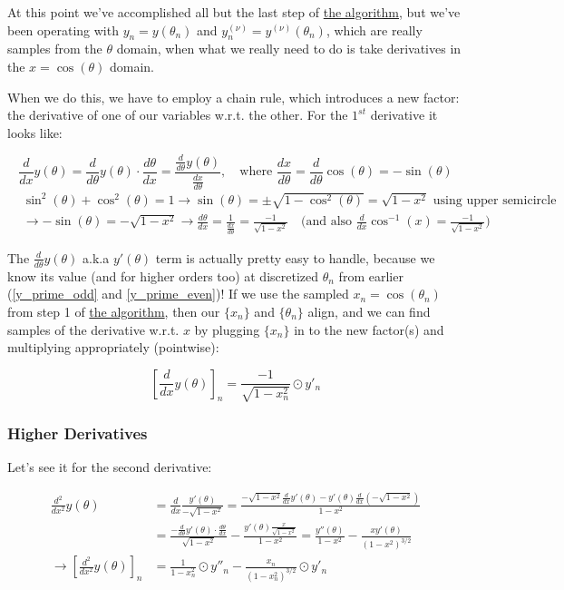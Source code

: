 \documentclass[10pt]{article}
\begin{document}
At this point we've accomplished all but the last step of \hyperref[algo]{the algorithm}, but we've been operating with $y_n = y(\theta_n)$ and $y_n^{(\nu)} = y^{(\nu)}(\theta_n)$, which are really samples from the $\theta$ domain, when what we really need to do is take derivatives in the $x = \cos(\theta)$ domain.

When we do this, we have to employ a chain rule, which introduces a new factor: the derivative of one of our variables w.r.t. the other. For the $1^{st}$ derivative it looks like:

$$\frac{d}{dx} y(\theta) = \frac{d}{d\theta} y(\theta) \cdot \frac{d\theta}{dx} = \frac{\frac{d}{d\theta} y(\theta)}{\frac{dx}{d\theta}}, \quad \text{where } \frac{dx}{d\theta} = \frac{d}{d\theta} \cos(\theta) = -\sin(\theta)$$
\begin{align*}
	& \sin^2(\theta) + \cos^2(\theta) = 1 \longrightarrow \sin(\theta) = \pm \sqrt{1-\cos^2(\theta)} = \sqrt{1 - x^2} \text{ using upper semicircle}\\
	& \longrightarrow -\sin(\theta) = -\sqrt{1 - x^2} \longrightarrow \frac{d\theta}{dx} = \frac{1}{\frac{dx}{d\theta}} = \frac{-1}{\sqrt{1 - x^2}} \quad \Big(\text{and also } \frac{d}{dx} \cos^{-1}(x) = \frac{-1}{\sqrt{1 - x^2}} \Big)
\end{align*}

The $\frac{d}{d\theta} y(\theta)$ a.k.a $y'(\theta)$ term is actually pretty easy to handle, because we know its value (and for higher orders too) at discretized $\theta_n$ from earlier (\autoref{y_prime_odd} and \autoref{y_prime_even})! If we use the sampled $x_n = \cos(\theta_n)$ from step 1 of \hyperref[algo]{the algorithm}, then our $\{x_n\}$ and $\{\theta_n\}$ align, and we can find samples of the derivative w.r.t. $x$ by plugging $\{x_n\}$ in to the new factor(s) and multiplying appropriately (pointwise):

$$[\frac{d}{dx} y(\theta)]_n = \frac{-1}{\sqrt{1 - x_n^2}} \odot y'_n$$

\subsubsection{Higher Derivatives}

Let's see it for the second derivative:

\begin{equation}\label{2nd}
\begin{aligned}
\frac{d^2}{dx^2} y(\theta) &= \frac{d}{dx} \frac{y'(\theta)}{-\sqrt{1-x^2}} = \frac{-\sqrt{1-x^2} \frac{d}{dx} y'(\theta) - y'(\theta) \frac{d}{dx} (-\sqrt{1-x^2})}{1 - x^2} \\
&= \frac{-\frac{d}{d\theta}y'(\theta)\cdot \frac{d\theta}{dx}}{\sqrt{1-x^2}} - \frac{y'(\theta)\frac{x}{\sqrt{1-x^2}}}{1 - x^2} = \frac{y''(\theta)}{1-x^2} - \frac{x y'(\theta)}{(1 - x^2)^{3/2}} \\
\longrightarrow [\frac{d^2}{dx^2} y(\theta)]_n &= \frac{1}{1-x_n^2} \odot y''_n - \frac{x_n}{(1 - x_n^2)^{3/2}} \odot y'_n
\end{aligned}
\end{equation}\vspace{2mm}
\end{document}
